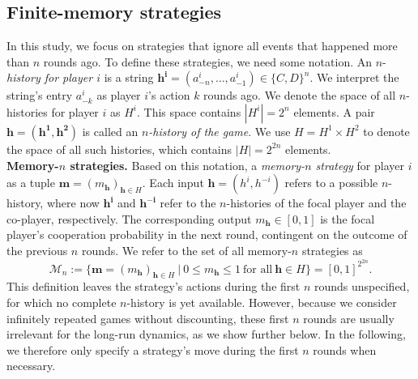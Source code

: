 \documentclass[11pt]{article}
\theoremstyle{plainCl1}
\theoremstyle{plainCl2}
\begin{document}
\subsection{Finite-memory strategies} 


In this study, we focus on strategies that ignore all events that happened more than $n$ rounds ago.
To define these strategies, we need some notation. 
An \(n\)-{\it history for player $i$} is a string \(\mathbf{h^i} \!=\! (a^i_{-n}, \ldots, a^i_{-1})\! \in \!\{C, D\}^n\). 
We interpret the string's entry \(a^i_{-k}\) as player \(i\)'s action \(k\) rounds ago. 
We denote the space of all \(n\)-histories for player \(i\) as \(H^i\). 
This space contains \(|H^i| \!=\! 2^n\) elements. 
A pair \(\mathbf{h} \!=\! (\mathbf{h^1}, \mathbf{h^2})\) is called an {\it \(n\)-history of the game}. 
We use \(H \!=\! H^1 \!\times\! H^2\) to denote the space of all such histories, which contains \(|H| \!=\! 2^{2n}\) elements.\\ 

\noindent
{\bfseries Memory-$n$ strategies.} Based on this notation, a {\it memory-$n$ strategy}  for player $i$ as a tuple \(\mathbf{m} \!=\! (m_\mathbf{h})_{\mathbf{h}\in H}\). 
Each input $\mathbf{h}\!=\!(h^i,h^{-i})$ refers to a possible $n$-history, where now $\mathbf{h^i}$ and $\mathbf{h^{-i}}$ refer to the $n$-histories of the focal player and the co-player, respectively. 
The corresponding output $m_\mathbf{h}\!\in\![0,1]$ is the focal player's cooperation probability in the next round, contingent on  the outcome of the previous \(n\) rounds. We refer to the set of all memory-$n$ strategies as 
\begin{equation}
\mathcal{M}_n:=\Big\{ \mathbf{m}\!=\!(m_\mathbf{h})_{\mathbf{h}\in H} ~\Big|~0\!\le\!m_\mathbf{h}\!\le\!1~\text{for all}~ \mathbf{h}\!\in\! H\Big\} = [0,1]^{2^{2n}} .
\end{equation}
This definition leaves the strategy's actions during the first $n$ rounds unspecified, for which no complete $n$-history is yet available. 
However, because we consider infinitely repeated games without discounting, these first $n$ rounds are usually irrelevant for the long-run dynamics, as we show further below. 
In the following, we therefore only specify a strategy's move during the first $n$ rounds when necessary. 

\end{document}
